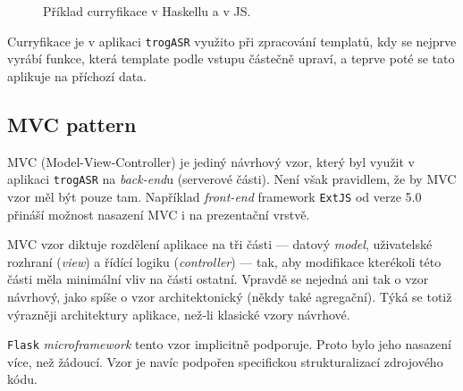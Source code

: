 \begin{figure}[h]
	
	\caption{Příklad curryfikace v Haskellu a v JS.}
	\label{fig:curry}
\end{figure}

Curryfikace je v aplikaci \verb|trogASR| využito při zpracování templatů, kdy se nejprve vyrábí funkce, která template podle vstupu částečně upraví, a teprve poté se tato aplikuje na příchozí data.

\subsection{MVC pattern}
\label{ssec:mvc}

MVC (Model-View-Controller) je jediný návrhový vzor, který byl využit v aplikaci \verb|trogASR| na {\sl back-end}u (serverové části). Není však pravidlem, že by MVC vzor měl být pouze tam. Například {\sl front-end} framework \verb|ExtJS| od verze 5.0 přináší možnost nasazení MVC i na prezentační vrstvě.

MVC vzor diktuje rozdělení aplikace na tři části --- datový {\sl model}, uživatelské rozhraní ({\sl view}) a řídící logiku ({\sl controller}) --- tak, aby modifikace kterékoli této části měla minimální vliv na části ostatní. Vpravdě se nejedná ani tak o vzor návrhový, jako spíše o vzor architektonický (někdy také agregační). Týká se totiž výrazněji architektury aplikace, než-li klasické vzory návrhové.

\verb|Flask| {\sl microframework} tento vzor implicitně podporuje. Proto bylo jeho nasazení více, než žádoucí. Vzor je navíc podpořen specifickou strukturalizací zdrojového kódu.